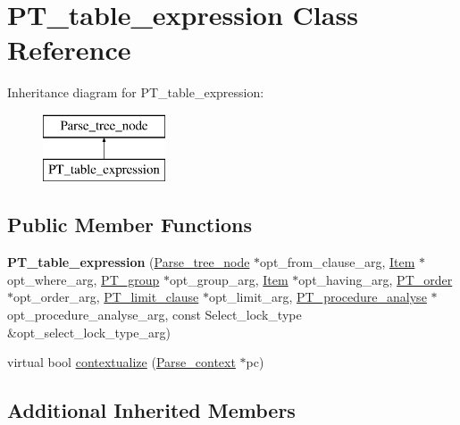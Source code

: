 \hypertarget{classPT__table__expression}{}\section{P\+T\+\_\+table\+\_\+expression Class Reference}
\label{classPT__table__expression}
Inheritance diagram for P\+T\+\_\+table\+\_\+expression\+:\begin{figure}[H]
\begin{center}
\leavevmode
\includegraphics[height=2.000000cm]{classPT__table__expression}
\end{center}
\end{figure}
\subsection*{Public Member Functions}
\begin{DoxyCompactItemize}
\item 
\mbox{\label{classPT__table__expression_abf6abf70cbf3e73b03ec7617bffede03}} 
{\bfseries P\+T\+\_\+table\+\_\+expression} (\mbox{\hyperlink{classParse__tree__node}{Parse\+\_\+tree\+\_\+node}} $\ast$opt\+\_\+from\+\_\+clause\+\_\+arg, \mbox{\hyperlink{classItem}{Item}} $\ast$opt\+\_\+where\+\_\+arg, \mbox{\hyperlink{classPT__group}{P\+T\+\_\+group}} $\ast$opt\+\_\+group\+\_\+arg, \mbox{\hyperlink{classItem}{Item}} $\ast$opt\+\_\+having\+\_\+arg, \mbox{\hyperlink{classPT__order}{P\+T\+\_\+order}} $\ast$opt\+\_\+order\+\_\+arg, \mbox{\hyperlink{classPT__limit__clause}{P\+T\+\_\+limit\+\_\+clause}} $\ast$opt\+\_\+limit\+\_\+arg, \mbox{\hyperlink{classPT__procedure__analyse}{P\+T\+\_\+procedure\+\_\+analyse}} $\ast$opt\+\_\+procedure\+\_\+analyse\+\_\+arg, const Select\+\_\+lock\+\_\+type \&opt\+\_\+select\+\_\+lock\+\_\+type\+\_\+arg)
\item 
virtual bool \mbox{\hyperlink{classPT__table__expression_a947974a68edf796f90266e545c080dd2}{contextualize}} (\mbox{\hyperlink{structParse__context}{Parse\+\_\+context}} $\ast$pc)
\end{DoxyCompactItemize}
\subsection*{Additional Inherited Members}


